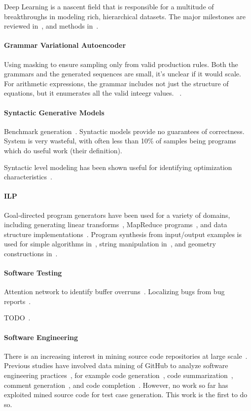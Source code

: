Deep Learning is a nascent field that is responsible for a multitude of breakthroughs in modeling rich, hierarchical datasets. The major milestones are reviewed in~\cite{Wang2017}, and methods in~\cite{Schmidhuber2014}.

\paragraph{Grammar Variational Autoencoder} Using masking to ensure sampling only from valid production rules. Both the grammars and the generated sequences are small, it's unclear if it would scale. For arithmetic expressions, the grammar includes not just the structure of equations, but it enumerates all the valid inteegr values. ~\cite{Kusner2017}.

\paragraph{Syntactic Generative Models} Benchmark generation~\cite{Cummins2017a}. Syntactic models provide no guarantees of correctness. System is very wasteful, with often less than 10\% of samples being programs which do useful work (their definition).

Syntactic level modeling has been shown useful for identifying optimization characteristics~\cite{Cummins2017b}.

\paragraph{ILP} Goal-directed program generators have been used for a variety of domains, including generating linear transforms~\cite{Voronenko2009}, MapReduce programs~\cite{Smith}, and data structure implementations~\cite{Loncaric2016}. Program synthesis from input/output examples is used for simple algorithms in~\cite{Zaremba2015a}, string manipulation in~\cite{Gulwani2011}, and geometry constructions in~\cite{Gulwani2012}.

\paragraph{Software Testing} Attention network to identify buffer overruns~\cite{Choi2016}. Localizing bugs from bug reports~\cite{Lam2016,Huo2016}.

TODO~\cite{White2016}.

\paragraph{Software Engineering} There is an increasing interest in mining source code repositories at large scale~\cite{Allamanis2013a,White2015a,Bird2009}. Previous studies have involved data mining of GitHub to analyze software engineering practices~\cite{Wu2014,Guzman2014,Baishakhi2014a,Vasilescu2015}, for example code generation~\cite{Zhang2015a}, code summarization~\cite{Allamanis2016}, comment generation~\cite{Wong2013}, and code completion~\cite{Raychev2014}. However, no work so far has exploited mined source code for test case generation. This work is the first to do so.
